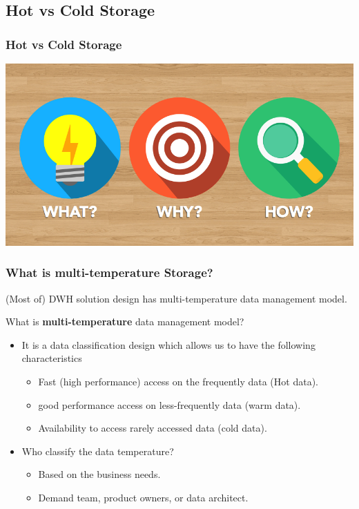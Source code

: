 \subsection{Hot vs Cold Storage}
\begin{frame}[c]
    \frametitle{Hot vs Cold Storage}

    \includegraphics[width=\textheight]{./Figures/chapter-01/WWH-Thumb.png}



\end{frame}


\begin{frame}
    \frametitle{What is multi-temperature Storage?}

    \begin{wideitemize}
        \item (Most of) DWH solution design has multi-temperature data management model.
        \item What is \textbf{multi-temperature} data management model?
        \begin{itemize}[<+->]
            \item It is a data classification design which allows us to have the following characteristics
            \begin{itemize}[<+->]
                \item Fast (high performance) access on the frequently data (Hot data).%
                \item good performance access on less-frequently data (warm data).
                \item Availability to access rarely accessed data (cold data).
            \end{itemize}
            \item Who classify the data temperature?
            \begin{itemize}[<+->]
                \item Based on the business needs.
                \item Demand team, product owners, or data architect.
            \end{itemize}

        \end{itemize}

    \end{wideitemize}
\end{frame}

